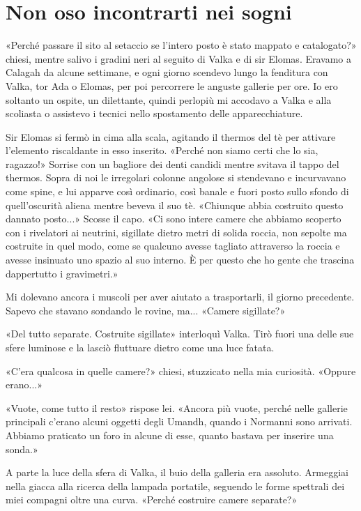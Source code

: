 \chapter{Non oso incontrarti nei sogni}

«Perché passare il sito al setaccio se l'intero posto è stato mappato e
catalogato?» chiesi, mentre salivo i gradini neri al seguito di Valka e
di sir Elomas. Eravamo a Calagah da alcune settimane, e ogni giorno
scendevo lungo la fenditura con Valka, tor Ada o Elomas, per poi
percorrere le anguste gallerie per ore. Io ero soltanto un ospite, un
dilettante, quindi perlopiù mi accodavo a Valka e alla scoliasta o
assistevo i tecnici nello spostamento delle apparecchiature.

Sir Elomas si fermò in cima alla scala, agitando il thermos del tè per
attivare l'elemento riscaldante in esso inserito. «Perché non siamo
certi che lo sia, ragazzo!» Sorrise con un bagliore dei denti candidi
mentre svitava il tappo del thermos. Sopra di noi le irregolari colonne
angolose si stendevano e incurvavano come spine, e lui apparve così
ordinario, così banale e fuori posto sullo sfondo di quell'oscurità
aliena mentre beveva il suo tè. «Chiunque abbia costruito questo dannato
posto...» Scosse il capo. «Ci sono intere camere che abbiamo scoperto
con i rivelatori ai neutrini, sigillate dietro metri di solida roccia,
non sepolte ma costruite in quel modo, come se qualcuno avesse tagliato
attraverso la roccia e avesse insinuato uno spazio al suo interno. È per
questo che ho gente che trascina dappertutto i gravimetri.»

Mi dolevano ancora i muscoli per aver aiutato a trasportarli, il giorno
precedente. Sapevo che stavano sondando le rovine, ma... «Camere
sigillate?»

«Del tutto separate. Costruite sigillate» interloquì Valka. Tirò fuori
una delle sue sfere luminose e la lasciò fluttuare dietro come una luce
fatata.

«C'era qualcosa in quelle camere?» chiesi, stuzzicato nella mia
curiosità. «Oppure erano...»

«Vuote, come tutto il resto» rispose lei. «Ancora più vuote, perché
nelle gallerie principali c'erano alcuni oggetti degli Umandh, quando i
Normanni sono arrivati. Abbiamo praticato un foro in alcune di esse,
quanto bastava per inserire una sonda.»

A parte la luce della sfera di Valka, il buio della galleria era
assoluto. Armeggiai nella giacca alla ricerca della lampada portatile,
seguendo le forme spettrali dei miei compagni oltre una curva. «Perché
costruire camere separate?»

